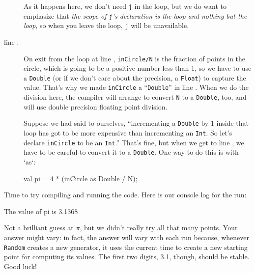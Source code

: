 \begin{description}
As it happens here, we don't need {\tt j} in the loop, but we do want to emphasize
that {\em the scope of {\tt j}'s declaration is the loop and nothing but the
loop}, so when you leave the loop, {\tt j} will be unavailable.  

\item[line  \xlref{mpi1-pi}{12}:]
On exit from the loop at line  , {\tt inCircle/N} is the fraction of points
in the circle, which is going to be a positive number less than 1, so we
have to use a {\tt Double} (or if we don't care about the precision, a {\tt Float})
to capture the value.  
That's why we made {\tt inCircle} a ``{\tt Double}'' in line  .
When we do the division here, the compiler will arrange to convert
{\tt N} to a {\tt Double}, too, and will use double precision floating
point division.  

Suppose we had said to ourselves, ``incrementing a {\tt Double} by 1 inside that
loop has got to
be more expensive than incrementing an {\tt Int}.  So let's declare {\tt inCircle} to be
an {\tt Int}.''  That's fine, but when we get to line , we have to be careful to
convert it to a {\tt Double}.  One way to do this is with \xcd`as`:
\begin{xten}
val pi = 4 * (inCircle as Double / N);
\end{xten}
\end{description}

Time to try compiling and running the code.  Here is our console log for the
run:
\begin{xten}
The value of pi is 3.1368
\end{xten}
Not a brilliant guess at $\pi$, but we didn't really try all that many points.  Your
answer might vary: in fact, the answer will vary with each run because, whenever
{\tt Random} creates a new generator, it
uses the current time to create a new starting point for computing its values.
The first two digits, 3.1, though, should be stable.  Good luck!

